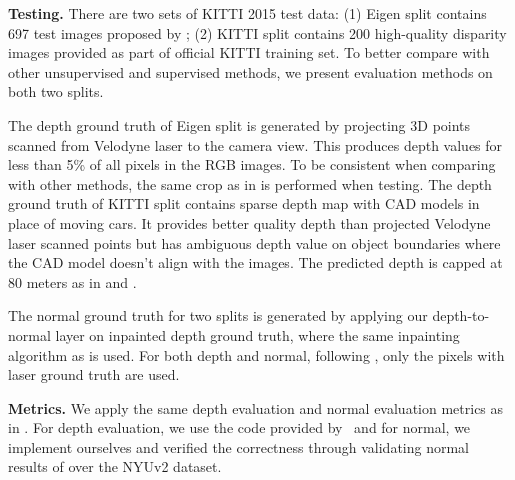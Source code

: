\textbf{Testing.}
There are two sets of KITTI 2015 test data: (1) Eigen split contains 697 test images proposed by \cite{eigen2014depth}; (2) KITTI split contains 200 high-quality disparity images provided as part of official KITTI training set.  To better compare with other unsupervised and supervised methods, we present evaluation methods on both two splits. 

The depth ground truth of Eigen split is generated by projecting 3D points scanned from Velodyne laser to the camera view. This produces depth values for less than 5\% of all pixels in the RGB images. To be consistent when comparing with other methods, the same crop as in \cite{eigen2014depth} is performed when testing. The depth ground truth of KITTI split contains sparse depth map with CAD models in place of moving cars. It provides better quality depth than projected Velodyne laser scanned points but has ambiguous depth value on object boundaries where the CAD model doesn't align with the images. The predicted depth is capped at 80 meters as in \cite{godard2016unsupervised} and \cite{zhou2017unsupervised}.

The normal ground truth for two splits is generated by applying our depth-to-normal layer on inpainted depth ground truth, where the same inpainting algorithm as \cite{silberman2012indoor} is used. For both depth and normal, following \cite{eigen2014depth}, only the pixels with laser ground truth are used.

\textbf{Metrics.} We apply the same depth evaluation and normal evaluation metrics as in \cite{eigen2015predicting}. For depth evaluation, we use the code provided by~\cite{zhou2017unsupervised} and for normal, we implement ourselves and verified the correctness through validating normal results of \cite{eigen2015predicting} over the NYUv2 dataset.







